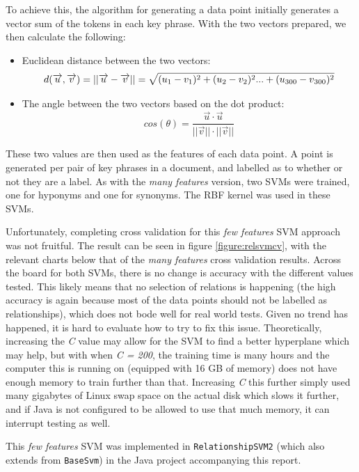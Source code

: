 To achieve this, the algorithm for generating a data point initially generates a vector sum of the tokens in each key phrase. With the two vectors prepared, we then calculate the following:
\begin{itemize}
	\item Euclidean distance between the two vectors:
	\begin{equation*}
	d(\overrightarrow{u}, \overrightarrow{v}) = ||\overrightarrow{u} - \overrightarrow{v}|| = \sqrt{(u_1 - v_1)^2 + (u_2 - v_2)^2 ... + (u\textsubscript{300} - v\textsubscript{300})^2}
	\end{equation*}
	\item The angle between the two vectors based on the dot product:
	\begin{equation*}
	cos(\theta) = \dfrac{\overrightarrow{u} \cdot \overrightarrow{u}}{||\overrightarrow{v}|| \cdot ||\overrightarrow{v}||}
	\end{equation*}
\end{itemize}

These two values are then used as the features of each data point. A point is generated per pair of key phrases in a document, and labelled as to whether or not they are a label. As with the \textit{many features} version, two SVMs were trained, one for hyponyms and one for synonyms. The RBF kernel was used in these SVMs.

Unfortunately, completing cross validation for this \textit{few features} SVM approach was not fruitful. The result can be seen in figure \ref{figure:relsvmcv}, with the relevant charts below that of the \textit{many features} cross validation results. Across the board for both SVMs, there is no change is accuracy with the different values tested. This likely means that no selection of relations is happening (the high accuracy is again because most of the data points should not be labelled as relationships), which does not bode well for real world tests. Given no trend has happened, it is hard to evaluate how to try to fix this issue. Theoretically, increasing the \textit{C} value may allow for the SVM to find a better hyperplane which may help, but with when \textit{C = 200}, the training time is many hours and the computer this is running on (equipped with 16 GB of memory) does not have enough memory to train further than that. Increasing \textit{C} this further simply used many gigabytes of Linux swap space on the actual disk which slows it further, and if Java is not configured to be allowed to use that much memory, it can interrupt testing as well.

This \textit{few features} SVM was implemented in \texttt{RelationshipSVM2} (which also extends from \texttt{BaseSvm}) in the Java project accompanying this report.
